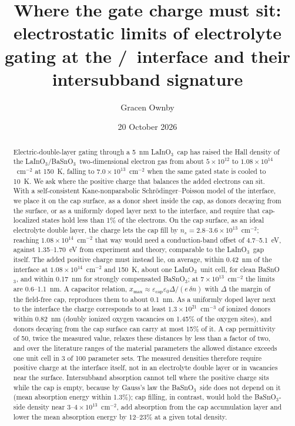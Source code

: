 \documentclass[11pt]{article}
\title{Where the gate charge must sit: electrostatic limits of electrolyte gating at the \LIO/\BSO\ interface and their intersubband signature}
\author{Gracen Ownby}
\affil{University of Oklahoma, Norman, Oklahoma, USA}
\date{\small 20 October 2026}
\newcommand{\LIO}{\texorpdfstring{LaInO$_3$}{LaInO3}}
\newcommand{\BSO}{\texorpdfstring{BaSnO$_3$}{BaSnO3}}
\newcommand{\xmax}{x_\mathrm{max}}
\begin{document}
\maketitle

\begin{abstract}
Electric-double-layer gating through a 5~nm \LIO\ cap has raised the Hall density of the \LIO/\BSO\ two-dimensional electron gas from about $5\times10^{12}$ to $1.08\times10^{14}$~cm$^{-2}$ at 150~K, falling to $7.0\times10^{13}$~cm$^{-2}$ when the same gated state is cooled to 10~K. We ask where the positive charge that balances the added electrons can sit. With a self-consistent Kane-nonparabolic Schr\"odinger--Poisson model of the interface, we place it on the cap surface, as a donor sheet inside the cap, as donors decaying from the surface, or as a uniformly doped layer next to the interface, and require that cap-localized states hold less than 1\% of the electrons. On the cap surface, as an ideal electrolyte double layer, the charge lets the cap fill by $n_s=2.8$--$3.6\times10^{13}$~cm$^{-2}$; reaching $1.08\times10^{14}$~cm$^{-2}$ that way would need a conduction-band offset of 4.7--5.1~eV, against 1.35--1.70~eV from experiment and theory, comparable to the \LIO\ gap itself. The added positive charge must instead lie, on average, within 0.42~nm of the interface at $1.08\times10^{14}$~cm$^{-2}$ and 150~K, about one \LIO\ unit cell, for clean \BSO, and within 0.17~nm for strongly compensated \BSO; at $7\times10^{13}$~cm$^{-2}$ the limits are 0.6--1.1~nm. A capacitor relation, $\xmax\approx\varepsilon_\mathrm{cap}\varepsilon_0\Delta/(e\,\delta n)$ with $\Delta$ the margin of the field-free cap, reproduces them to about 0.1~nm. As a uniformly doped layer next to the interface the charge corresponds to at least $1.3\times10^{21}$~cm$^{-3}$ of ionized donors within 0.82~nm (doubly ionized oxygen vacancies on 1.45\% of the oxygen sites), and donors decaying from the cap surface can carry at most 15\% of it. A cap permittivity of 50, twice the measured value, relaxes these distances by less than a factor of two, and over the literature ranges of the material parameters the allowed distance exceeds one unit cell in 3 of 100 parameter sets. The measured densities therefore require positive charge at the interface itself, not in an electrolyte double layer or in vacancies near the surface. Intersubband absorption cannot tell where the positive charge sits while the cap is empty, because by Gauss's law the \BSO\ side does not depend on it (mean absorption energy within 1.3\%); cap filling, in contrast, would hold the \BSO-side density near $3$--$4\times10^{13}$~cm$^{-2}$, add absorption from the cap accumulation layer and lower the mean absorption energy by 12--23\% at a given total density.
\end{abstract}
\end{document}
